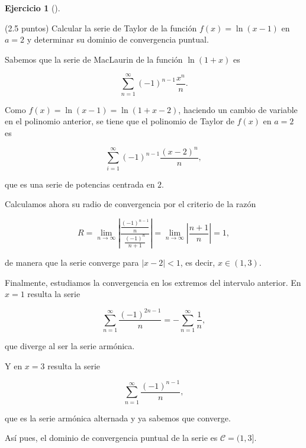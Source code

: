 \documentclass[
  spanish,
  a4paper,
]{scrreport}
\theoremstyle{definition}
\newtheorem{exercise}{Ejercicio}[chapter]
\theoremstyle{remark}
\begin{document}
\begin{exercise}[]\protect\hypertarget{exr-7}{}\label{exr-7}

(2.5 puntos) Calcular la serie de Taylor de la función \(f(x)=\ln(x-1)\)
en \(a=2\) y determinar su dominio de convergencia puntual.

\end{exercise}

\begin{tcolorbox}[enhanced jigsaw, arc=.35mm, bottomrule=.15mm, bottomtitle=1mm, breakable, colback=white, colbacktitle=quarto-callout-tip-color!10!white, colframe=quarto-callout-tip-color-frame, coltitle=black, left=2mm, leftrule=.75mm, opacityback=0, opacitybacktitle=0.6, rightrule=.15mm, title=\textcolor{quarto-callout-tip-color}{\faLightbulb}\hspace{0.5em}{Solución}, titlerule=0mm, toprule=.15mm, toptitle=1mm]

Sabemos que la serie de MacLaurin de la función \(\ln(1+x)\) es

\[
\sum_{n=1}^\infty (-1)^{n-1}\frac{x^n}{n}. 
\]

Como \(f(x) = \ln(x-1) = \ln(1+x-2)\), haciendo un cambio de variable en
el polinomio anterior, se tiene que el polinomio de Taylor de \(f(x)\)
en \(a=2\) es

\[
\sum_{i=1}^\infty (-1)^{n-1}\frac{(x-2)^n}{n},
\]

que es una serie de potencias centrada en \(2\).

Calculamos ahora su radio de convergencia por el criterio de la razón

\[
R = \lim_{n\to\infty} \left | \frac{\frac{(-1)^{n-1}}{n}}{\frac{(-1)^n}{n+1}}\right| 
= \lim_{n\to\infty} \left|\frac{n+1}{n}\right|
= 1,
\]

de manera que la serie converge para \(|x-2|<1\), es decir,
\(x\in (1, 3)\).

Finalmente, estudiamos la convergencia en los extremos del intervalo
anterior. En \(x=1\) resulta la serie

\[
\sum_{n=1}^\infty \frac{(-1)^{2n-1}}{n} = -\sum_{n=1}^\infty \frac{1}{n},
\]

que diverge al ser la serie armónica.

Y en \(x=3\) resulta la serie

\[
\sum_{n=1}^\infty \frac{(-1)^{n-1}}{n},
\]

que es la serie armónica alternada y ya sabemos que converge.

Así pues, el dominio de convergencia puntual de la serie es
\(\mathcal{C} = (1,3]\).

\end{tcolorbox}
\end{document}
